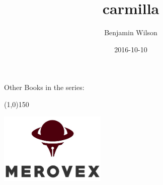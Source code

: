\documentclass[11pt,twoside,makeidx,hidelinks,]{memoir}
\title{carmilla}
\author{Benjamin Wilson}
\date{2016-10-10}
\def\seriespage{\thispagestyle{empty}
\begin{center}
  \noindent{\large\theseriestitle}
  \vskip10.5pt
  \noindent Other Books in the series:
  \vskip4pt
  \theseriesbooks
\end{center}\cleardoublepage}
\begin{document}
\frontmatter
  \begin{titlingpage}
    \pagestyle{empty}
    \begin{center}
    \vspace*{2in}

    \Huge\textbf{\textsf\thetitle}

    \vspace*{0.75in}

    \Large\textsf\theauthor

    \vspace*{\fill}
    \end{center}
  \end{titlingpage}

  \seriespage
 \newpage
  \begin{titlingpage}
    \pagestyle{empty}
    \begin{center}
    \vspace*{\fill}

    \HUGE\textbf{\textsf\thetitle}

    \vspace*{0.25in}
    \line(1,0){150}
    \vspace*{0.25in}

    \Large\textsf\theauthor

    \vspace*{\fill}

    \vspace*{\fill}
    \includegraphics[width=2in]{_images/logo.png}\\[0cm]
    \end{center}
  \end{titlingpage}

  \vspace*{\fill}
  \pagestyle{empty}

  \par\noindent\emph{\thetitle}
  \newline
\end{document}
